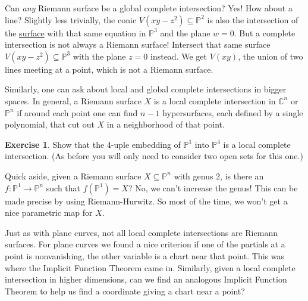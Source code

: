 \documentclass[12pt]{article}
\newcommand{\cx}{\mathbb{C}}
\newcommand{\p}{\mathbb{P}}
\newcommand{\ita}[1]{\textit{#1}}
\theoremstyle{definition}
\newtheorem{exercise}{Exercise}
\theoremstyle{remark}
\begin{document}
Can \ita{any} Riemann surface be a global complete intersection? Yes! How about a line? Slightly less trivially, the conic $V(xy - z^2) \subseteq \p^2$ is also the intersection of the \underline{surface} with that same equation in $\p^3$ and the plane $w = 0$. But a complete intersection is not always a Riemann surface! Intersect that same surface $V(xy - z^2) \subseteq \p^3$ with the plane $z = 0$ instead. We get $V(xy)$, the union of two lines meeting at a point, which is not a Riemann surface.

Similarly, one can ask about local and global complete intersections in bigger spaces. In general, a Riemann surface $X$ is a local complete intersection in $\cx^n$ or $\p^n$ if around each point one can find $n-1$ hypersurfaces, each defined by a single polynomial, that cut out $X$ in a neighborhood of that point.
\begin{exercise}
    Show that the 4-uple embedding of $\p^1$ into $\p^4$ is a local complete intersection. (As before you will only need to consider two open sets for this one.)
\end{exercise}
Quick aside, given a Riemann surface $X \subseteq \p^n$ with genus 2, is there an $f : \p^1 \to \p^n$ such that $f(\p^1) = X$? No, we can't increase the genus! This can be made precise by using Riemann-Hurwitz. So most of the time, we won't get a nice parametric map for $X$.

Just as with plane curves, not all local complete intersections are Riemann surfaces. For plane curves we found a nice criterion if one of the partials at a point is nonvanishing, the other variable is a chart near that point. This was where the Implicit Function Theorem came in. Similarly, given a local complete intersection in higher dimensions, can we find an analogous Implicit Function Theorem to help us find a coordinate giving a chart near a point?
\end{document}
